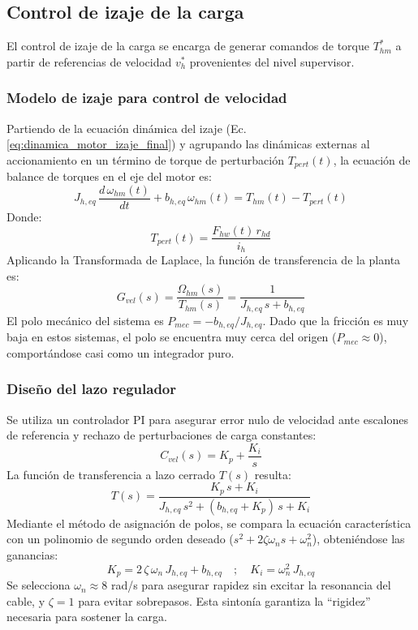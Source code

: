 \subsection{Control de izaje de la carga}
El control de izaje de la carga se encarga de generar comandos de torque $T_{hm}^\ast$ a partir de referencias de velocidad $v_h^\ast$
provenientes del nivel supervisor.

\subsubsection{Modelo de izaje para control de velocidad} \label{sec:control_izaje}
Partiendo de la ecuación dinámica del izaje (Ec. \ref{eq:dinamica_motor_izaje_final}) y agrupando las dinámicas externas 
al accionamiento en un término de torque de perturbación $T_{pert}(t)$, la ecuación de balance de torques en el eje del motor es:
\begin{equation}
    J_{h,eq} \, \frac{d \, \omega_{hm}(t)}{dt} + b_{h,eq} \, \omega_{hm}(t) = T_{hm}(t) - T_{pert}(t)
\end{equation}
Donde:
\begin{equation}
    T_{pert}(t) = \frac{F_{hw}(t) \, r_{hd}}{i_h}
\end{equation}
Aplicando la Transformada de Laplace, la función de transferencia de la planta es:
\begin{equation} \label{eq:G_vel}
    G_{vel}(s) = \frac{\Omega_{hm}(s)}{T_{hm}(s)} = \frac{1}{J_{h,eq} \, s + b_{h,eq}}
\end{equation}
El polo mecánico del sistema es $P_{mec} = -b_{h,eq}/J_{h,eq}$. Dado que la fricción es muy baja en estos sistemas, el polo se encuentra muy cerca del origen ($P_{mec} \approx 0$), comportándose casi como un integrador puro.

\subsubsection{Diseño del lazo regulador}
Se utiliza un controlador PI para asegurar error nulo de velocidad ante escalones de referencia y rechazo de perturbaciones de carga constantes:
\begin{equation}
    C_{vel}(s) = K_p + \frac{K_i}{s}
\end{equation}
La función de transferencia a lazo cerrado $T(s)$ resulta:
\begin{equation}
    T(s) = \frac{K_p \, s + K_i}{J_{h,eq} \, s^2 + (b_{h,eq} + K_p) \, s + K_i}
\end{equation}
Mediante el método de asignación de polos, se compara la ecuación característica con un polinomio de segundo orden deseado ($s^2 + 2\zeta\omega_ns + \omega_n^2$), obteniéndose las ganancias:
\begin{equation} \label{eq:gains_hoist}
    K_p = 2 \, \zeta \, \omega_n \, J_{h,eq} + b_{h,eq} \quad ; \quad K_i = \omega_n^2 \, J_{h,eq}
\end{equation}
Se selecciona $\omega_n \approx 8$ rad/s para asegurar rapidez sin excitar la resonancia del cable, y $\zeta = 1$ para evitar sobrepasos. Esta sintonía garantiza la ``rigidez'' necesaria para sostener la carga.

